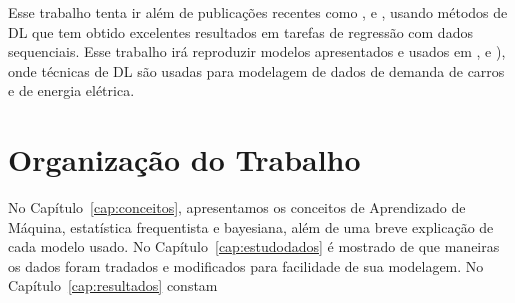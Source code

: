 Esse trabalho tenta ir além de publicações recentes como \citet{cementnn1},
\citet{cementnn2} e \citet{cementml}, usando métodos de DL que tem
obtido excelentes resultados em tarefas de
regressão com dados sequenciais. Esse trabalho irá reproduzir modelos
apresentados e usados em \cite{ubertime}, \cite{lstmbr} e \cite{energylstm}), onde
técnicas de DL são usadas para modelagem de dados de demanda de carros e de energia elétrica. 

\section{Organização do Trabalho}
\label{sec:organizacao_trabalho}

No Capítulo~\ref{cap:conceitos}, apresentamos os conceitos de Aprendizado de
Máquina, estatística frequentista e bayesiana, além de uma breve explicação
de cada modelo usado. No Capítulo~\ref{cap:estudodados} é mostrado de que
maneiras os dados foram tradados e modificados para facilidade de sua modelagem.
No Capítulo~\ref{cap:resultados} constam 



